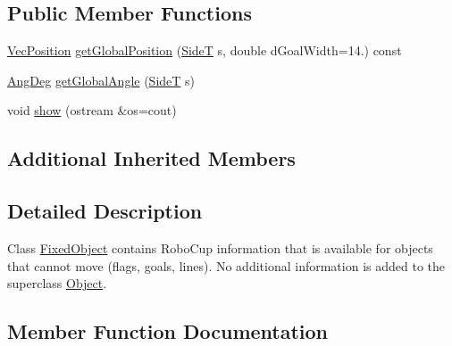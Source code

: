 \subsection*{Public Member Functions}
\begin{DoxyCompactItemize}
\item 
\hyperlink{classVecPosition}{Vec\+Position} \hyperlink{classFixedObject_a7a50b54f0ca18257ab3d45afb3fd816c}{get\+Global\+Position} (\hyperlink{SoccerTypes_8h_a8e9b8119c00121a197203aca01d5b090}{SideT} s, double d\+Goal\+Width=14.) const 
\item 
\hyperlink{Geometry_8h_a6bfe02ae9bb185092902092561ab2865}{Ang\+Deg} \hyperlink{classFixedObject_abcbfb2537519c3328a896b3b44070ea6}{get\+Global\+Angle} (\hyperlink{SoccerTypes_8h_a8e9b8119c00121a197203aca01d5b090}{SideT} s)
\item 
void \hyperlink{classFixedObject_ad8771b36cc2073d4a9fe1879b2f91d06}{show} (ostream \&os=cout)
\end{DoxyCompactItemize}
\subsection*{Additional Inherited Members}


\subsection{Detailed Description}
Class \hyperlink{classFixedObject}{Fixed\+Object} contains Robo\+Cup information that is available for objects that cannot move (flags, goals, lines). No additional information is added to the superclass \hyperlink{classObject}{Object}. 

\subsection{Member Function Documentation}
